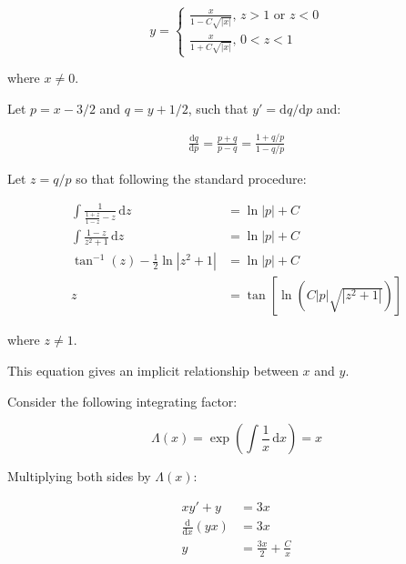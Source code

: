 \documentclass[12pt]{article}
\begin{document}
\begin{equation}
    y =
    \begin{cases}
        \frac{x}{1 - C\sqrt{\left\lvert x \right\rvert}}, \, z > 1 \text{ or } z < 0 \\
        \frac{x}{1 + C\sqrt{\left\lvert x \right\rvert}}, \, 0 < z < 1
    \end{cases}
\end{equation}

where $x \ne 0$.


Let $p = x - 3/2$ and $q = y + 1/2$, such that $y' = \mathrm{d}q/\mathrm{d}p$ and:

\begin{equation}
    \begin{split}
        \frac{\mathrm{d}q}{\mathrm{d}p} = \frac{p + q}{p - q} = \frac{1 + q/p}{1 - q/p}
    \end{split}
\end{equation}

Let $z = q/p$ so that following the standard procedure:

\begin{equation}
    \begin{split}
        \int \frac{1}{\frac{1 + z}{1 - z} - z} \, \mathrm{d}z &= \ln{\left\lvert p \right\rvert} + C \\
        \int \frac{1 - z}{z^{2} + 1} \, \mathrm{d}z &= \ln{\left\lvert p \right\rvert} + C \\
        \tan^{-1}{(z)} - \frac{1}{2} \ln{\left\lvert z^{2} + 1 \right\rvert} &= \ln{\left\lvert p \right\rvert} + C \\
        z &= \tan{\left[ \ln{(C \left\lvert p \right\rvert \sqrt{\left\lvert z^{2} + 1 \right\rvert})} \right]}
    \end{split}
\end{equation}

where $z \ne 1$.

This equation gives an implicit relationship between $x$ and $y$.


Consider the following integrating factor:

\begin{equation}
    \Lambda(x) = \exp(\int \frac{1}{x} \, \mathrm{d}x) = x
\end{equation}

Multiplying both sides by $\Lambda(x)$:

\begin{equation}
    \begin{split}
        xy' + y &= 3x \\
        \frac{\mathrm{d}}{\mathrm{d}x} (yx) &= 3x \\
        y &= \frac{3x}{2} + \frac{C}{x}
    \end{split}
\end{equation}
\end{document}
